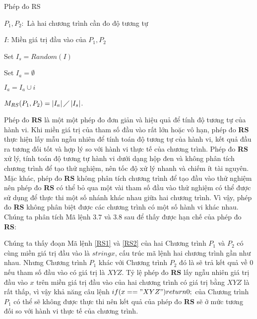 \begin{algorithm}[H]
	\caption{Phép đo RS}
	\begin{algorithmic}	
		\item $P_{1}, P_{2}:$ Là hai chương trình cần đo độ tương tự
		\item $I$: Miền giá trị đầu vào của $P_{1}, P_{2}$
		\item Set $I_{s} = Random(I)$ 
		\item Set $I_{a} = \emptyset$ 
		  
				
				\State $I_{a} = I_{a} \cup i$		
				\EndIf
		\EndWhile
		\item $M_{RS}(P_{1}, P_{2}) = \left|I_{a}\right| \diagup \left|I_{s}\right| $. 
	\end{algorithmic}
\end{algorithm}


Phép đo \textbf{RS} là một một phép đo đơn giản và hiệu quả để tính độ tương tự của hành vi. Khi miền giá trị của tham số đầu vào rất lớn hoặc vô hạn, phép đo \textbf{RS} thực hiện lấy mẫu ngẫu nhiên để tính toán độ tương tự của hành vi, kết quả đầu ra tương đối tốt và hợp lý so với hành vi thực tế của chương trình. Phép đo \textbf{RS} xử lý, tính toán độ tương tự hành vi dưới dạng hộp đen và không phân tích chương trình để tạo thử nghiệm, nên tốc độ xử lý nhanh và chiếm ít tài nguyên. Mặc khác, phép đo \textbf{RS} không phân tích chương trình để tạo đầu vào thử nghiệm nên phép đo \textbf{RS} có thể bỏ qua một vài tham số đầu vào thử nghiệm có thể được sử dụng để thực thi một số nhánh khác nhau giữa hai chương trình. Vì vậy, phép đo \textbf{RS} không phân biệt được các chương trình có một số hành vi khác nhau. Chúng ta phân tích Mã lệnh $3.7$ và $3.8$ sau để thấy được hạn chế của phép đo \textbf{RS}:

\begin{minipage}[t]{0.45\linewidth}
	
\end{minipage}%
\hfill\vrule\hfill
\begin{minipage}[t]{0.45\linewidth} 
	
\end{minipage}%
 
Chúng ta thấy đoạn Mã lệnh \ref{RS1} và \ref{RS2} của hai Chương trình $P_{1}$ và $P_{2}$ có cùng miền giá trị đầu vào là $string x$, cấu trúc mã lệnh hai chương trình gần như nhau. Nhưng Chương trình $P_{1}$ khác với Chương trình $P_{2}$ đó là sẽ trả kết quả về $0$ nếu tham số đầu vào có giá trị là $XYZ$. Tỷ lệ phép đo \textbf{RS} lấy ngẫu nhiên giá trị đầu vào $x$ trên miền giá trị đầu vào của hai chương trình có giá trị bằng $XYZ$ là rất thấp, vì vậy khả năng câu lệnh $if (x == "XYZ") return 0;$ của Chương trình $P_{1}$ có thể sẽ không được thực thi nên kết quả của phép đo \textbf{RS} sẽ ở mức tương đối so với hành vi thực tế của chương trình.

